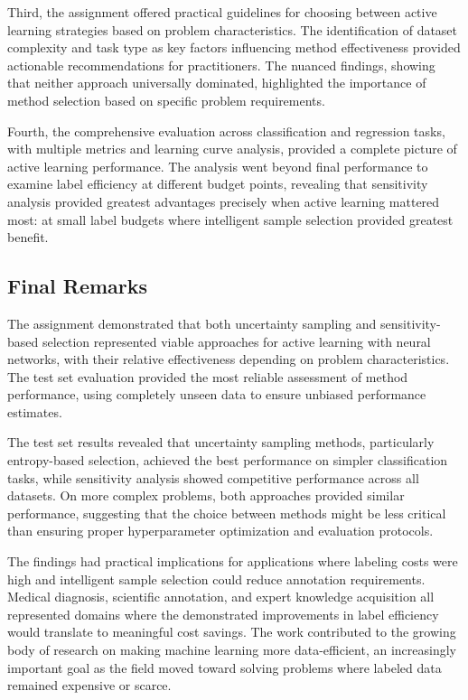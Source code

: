 \documentclass[conference]{IEEEtran}
\begin{document}
Third, the assignment offered practical guidelines for choosing between active learning strategies based on problem characteristics. The identification of dataset complexity and task type as key factors influencing method effectiveness provided actionable recommendations for practitioners. The nuanced findings, showing that neither approach universally dominated, highlighted the importance of method selection based on specific problem requirements.

Fourth, the comprehensive evaluation across classification and regression tasks, with multiple metrics and learning curve analysis, provided a complete picture of active learning performance. The analysis went beyond final performance to examine label efficiency at different budget points, revealing that sensitivity analysis provided greatest advantages precisely when active learning mattered most: at small label budgets where intelligent sample selection provided greatest benefit.

\subsection{Final Remarks}

The assignment demonstrated that both uncertainty sampling and sensitivity-based selection represented viable approaches for active learning with neural networks, with their relative effectiveness depending on problem characteristics. The test set evaluation provided the most reliable assessment of method performance, using completely unseen data to ensure unbiased performance estimates.

The test set results revealed that uncertainty sampling methods, particularly entropy-based selection, achieved the best performance on simpler classification tasks, while sensitivity analysis showed competitive performance across all datasets. On more complex problems, both approaches provided similar performance, suggesting that the choice between methods might be less critical than ensuring proper hyperparameter optimization and evaluation protocols.

The findings had practical implications for applications where labeling costs were high and intelligent sample selection could reduce annotation requirements. Medical diagnosis, scientific annotation, and expert knowledge acquisition all represented domains where the demonstrated improvements in label efficiency would translate to meaningful cost savings. The work contributed to the growing body of research on making machine learning more data-efficient, an increasingly important goal as the field moved toward solving problems where labeled data remained expensive or scarce.
\end{document}
